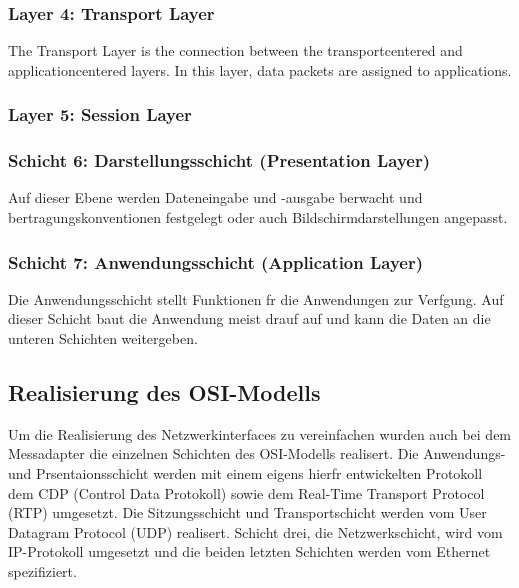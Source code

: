 \documentclass[a4paper]{book}%
\begin{document}
\subsubsection{Layer 4: Transport Layer}
The Transport Layer is the connection between the transportcentered and applicationcentered layers. In this layer, data packets are assigned to applications.

\subsubsection{Layer 5: Session Layer}

\subsubsection{Schicht 6: Darstellungsschicht (Presentation Layer)}
Auf dieser Ebene werden Dateneingabe und -ausgabe berwacht und bertragungskonventionen festgelegt oder auch Bildschirmdarstellungen angepasst.

\subsubsection{Schicht 7: Anwendungsschicht (Application Layer)}
Die Anwendungsschicht stellt Funktionen fr die Anwendungen zur Verfgung. Auf dieser Schicht baut die Anwendung meist drauf auf und kann 
die Daten an die unteren Schichten weitergeben.

\newpage

\subsection{Realisierung des OSI-Modells}


Um die Realisierung des Netzwerkinterfaces zu vereinfachen wurden auch bei dem Messadapter die einzelnen Schichten des OSI-Modells realisert.
Die Anwendungs- und Prsentaionsschicht werden mit einem eigens hierfr entwickelten Protokoll dem CDP (Control Data Protokoll) sowie dem Real-Time Transport Protocol (RTP) umgesetzt. Die Sitzungsschicht und Transportschicht werden vom User Datagram Protocol (UDP) realisert. Schicht drei, die Netzwerkschicht, wird vom IP-Protokoll umgesetzt und die beiden letzten Schichten werden vom Ethernet spezifiziert.
\end{document}
